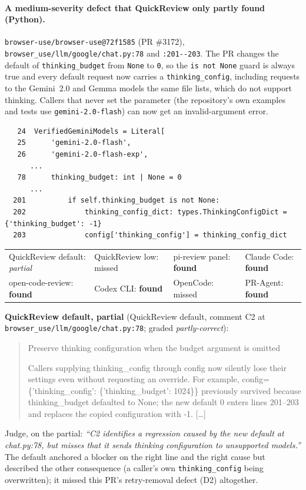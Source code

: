 \documentclass[11pt,a4paper]{article}
\newcommand{\qcr}{QuickReview}
\newcommand{\code}[1]{\texttt{#1}}
\begin{document}
\paragraph{A medium-severity defect that \qcr{} only partly found
(Python).} \code{browser-use/\allowbreak{}browser-use@72f1585} (PR \#3172),
\code{browser\_use/\allowbreak{}llm/\allowbreak{}google/\allowbreak{}chat.py:78} and \code{:201-{}-203}. The PR changes
the default of \code{thinking\_budget} from \code{None} to \code{0}, so the
\code{is not None} guard is always true and every default request now
carries a \code{thinking\_config}, including requests to the Gemini~2.0 and
Gemma models the same file lists, which do not support thinking. Callers
that never set the parameter (the repository's own examples and tests use
\code{gemini-2.0-flash}) can now get an invalid-argument error.
{\footnotesize
\begin{verbatim}
   24  VerifiedGeminiModels = Literal[
   25      'gemini-2.0-flash',
   26      'gemini-2.0-flash-exp',
      ...
   78      thinking_budget: int | None = 0
      ...
  201          if self.thinking_budget is not None:
  202              thinking_config_dict: types.ThinkingConfigDict = {'thinking_budget': -1}
  203              config['thinking_config'] = thinking_config_dict
\end{verbatim}
}
\begin{center}\footnotesize
\begin{tabular}{@{}llll@{}}
\hline
QuickReview default: \emph{partial} & QuickReview low: missed & pi-review panel: \textbf{found} & Claude Code: \textbf{found} \\
open-code-review: \textbf{found} & Codex CLI: \textbf{found} & OpenCode: missed & PR-Agent: \textbf{found} \\
\hline
\end{tabular}
\end{center}
\noindent\textbf{QuickReview default, partial} (QuickReview default, comment C2 at \code{browser\_use/\allowbreak{}llm/\allowbreak{}google/\allowbreak{}chat.py:78}; graded \emph{partly-correct}):
\begin{quote}\small
Preserve thinking configuration when the budget argument is omitted\par Callers supplying thinking\_config through config now silently lose their settings even without requesting an override. For example, config=\{'thinking\_config': \{'thinking\_budget': 1024\}\} previously survived because thinking\_budget defaulted to None; the new default 0 enters lines 201--203 and replaces the copied configuration with -1. [\ldots]
\end{quote}
\noindent Judge, on the partial: \emph{``C2 identifies a regression caused by the new default at chat.py:78, but misses that it sends thinking configuration to unsupported models.''}
The default anchored a blocker on the right line and the right cause but described the other consequence (a caller's own \code{thinking\_config} being overwritten); it missed this PR's retry-removal defect (D2) altogether.
\end{document}
